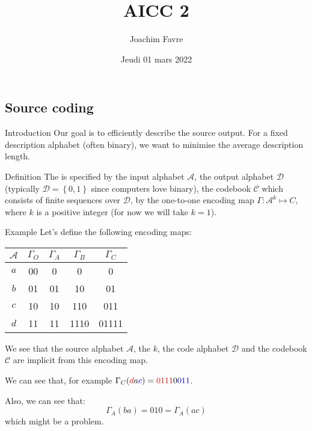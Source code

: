\documentclass[a4paper]{article}
\title{AICC 2}
\author{Joachim Favre}
\date{Jeudi 01 mars 2022}
\begin{document}
\maketitle


\subsection{Source coding}
\begin{parag}{Introduction}
    Our goal is to efficiently describe the source output. For a fixed description alphabet (often binary), we want to minimise the average description length. 
\end{parag}

\begin{parag}{Definition}
    The  is specified by the input alphabet $\mathcal{A}$, the output alphabet $\mathcal{D}$ (typically $\mathcal{D} = \left\{0, 1\right\}$ since computers love binary), the codebook $\mathcal{C}$ which consists of finite sequences over $\mathcal{D}$, by the one-to-one encoding map $\Gamma : \mathcal{A}^k \mapsto C$, where $k$ is a positive integer (for now we will take $k = 1$).
\end{parag}

\begin{parag}{Example}
    Let's define the following encoding maps:
    \begin{center}
    \begin{tabular}{c|cccc}
        $\mathcal{A}$ & $\Gamma_O$ & $\Gamma_A$ & $\Gamma_B$ & $\Gamma_C$  \\
        \hline
        $a$ & 00 & 0 & 0 & 0 \\
        $b$ & 01 & 01 & 10 & 01 \\
        $c$ & 10 & 10 & 110 & 011 \\
        $d$ & 11 & 11 & 1110 & 01111
    \end{tabular}
    \end{center}

    We see that the source alphabet $\mathcal{A}$, the $k$, the code alphabet $\mathcal{D}$ and the codebook $\mathcal{C}$ are implicit from this encoding map.

    We can see that, for example $\Gamma_C\left({\color{red}d}a{\color{blue}c}\right) = {\color{red}0111}0{\color{blue}011}$.

    Also, we can see that: 
    \[\Gamma_A\left(ba\right) = 010 = \Gamma_A\left(ac\right)\]
    which might be a problem.
\end{parag}
\end{document}
